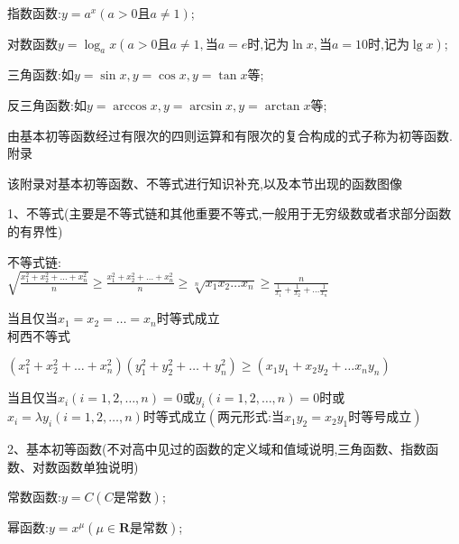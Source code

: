 \documentclass[UTF8]{ctexart}
\begin{document}
指数函数:$y=a^{x}(a>0\text{且}a\neq 1)$;

对数函数$y=\log _{a}x(a>0\text{且}a\neq 1,\text{当}a=e\text{时,记为}\ln x,\text{当}a=10\text{时,记为}\lg x)$;

三角函数:如$y=\sin x,y=\cos x,y=\tan x$等;

反三角函数:如$y=\arccos x,y=\arcsin x,y=\arctan x$等;

由基本初等函数经过有限次的四则运算和有限次的复合构成的式子称为初等函数.\\

{\heiti 附录}

该附录对基本初等函数、不等式进行知识补充,以及本节出现的函数图像

1、不等式(主要是不等式链和其他重要不等式,一般用于无穷级数或者求部分函数的有界性)

不等式链:\\

$\displaystyle  \sqrt{\frac{x_{1}^{2}+x_{2}^{2}+\ldots +x_{n}^{2}}{n}}\geqslant  \frac{x_{1}^{2}+x_{2}^{2}+\ldots +x_{n}^{2}}{n}\geqslant \sqrt[n]{x_{1}x_{2}\ldots x_{n} } \geqslant \frac{n}{\frac{1}{x_{1}}+\frac{1}{x_{2}}+\ldots \frac{1}{x_{n}}} $

当且仅当$x_{1}=x_{2}=\ldots =x_{n}$时等式成立\\

柯西不等式

$\displaystyle (x_{1}^{2}+x_{2}^{2}+\ldots +x_{n}^{2})(y_{1}^{2}+y_{2}^{2}+\ldots +y_{n}^{2})\geqslant (x_{1}y_{1}+x_{2}y_{2}+\ldots x_{n}y_{n})$

当且仅当$x_{i}(i=1,2,\ldots ,n)=0$或$y_{i}(i=1,2,\ldots ,n)=0$时或$x_{i}=\lambda y_{i}(i=1,2,\ldots ,n)$时等式成立$(\text{两元形式:当}x_{1}y_{2}=x_{2}y_{1}\text{时等号成立})$

2、基本初等函数(不对高中见过的函数的定义域和值域说明,三角函数、指数函数、对数函数单独说明)

常数函数:$y=C(C\text{是常数})$;

幂函数:$y=x^{\mu }(\mu \in \mathbf{R} \text{是常数})$;
\end{document}
